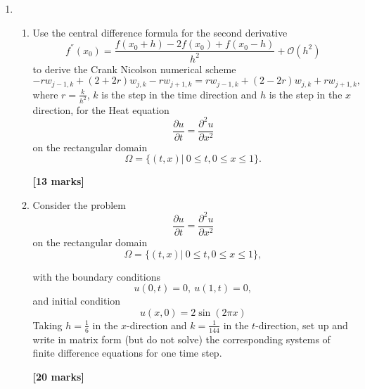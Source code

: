 \begin{enumerate}
\begin{enumerate}
\begin{flushright}
\end{flushright}
	
	
\end{enumerate}

	\item 
\begin{enumerate}
	
	\item 
	Use the central difference formula for the second derivative 
	\[ f^{''}(x_0)=\frac{f(x_0+h)-2f(x_0)+f(x_0-h)}{h^2}+\mathcal{O}(h^2)\]
	to derive the Crank Nicolson numerical scheme
	\[-rw_{j-1,k}+(2+2r)w_{j,k}-rw_{j+1,k}=rw_{j-1,k}+(2-2r)w_{j,k}+rw_{j+1,k},\]
	where $r=\frac{k}{h^2}$, $k$ is the step in the time direction and $h$ is the step in the $x$ direction, 
	for the Heat equation 
	\[\frac{\partial u}{\partial t}=\frac{\partial^2 u}{\partial x^2} \]
	on the rectangular domain
		\[\Omega=\{(t,x)| \ 0\leq t, 0 \leq x \leq 1\}. \]

\begin{flushright}
\textbf{[13 marks]}
\end{flushright}
	\item Consider the problem
	\[\frac{\partial u}{\partial t}=\frac{\partial^2 u}{\partial x^2} \]
	on the rectangular domain
		\[\Omega=\{(t,x)| \ 0\leq t, 0 \leq x \leq 1\}, \]

	with the boundary conditions
	\[ u(0,t)=0, \ u(1,t)=0,   \]
	and initial condition
	\[	u(x,0)=2\sin(2\pi x) \]
		Taking $h=\frac{1}{6}$ in the $x$-direction and $k=\frac{1}{144}$ in the $t$-direction, set up and write in matrix form (but do not solve) the corresponding systems of finite difference equations for one time step.\\
\begin{flushright}
\textbf{[20 marks]}
\end{flushright}
	
	
\end{enumerate}


\end{enumerate}

